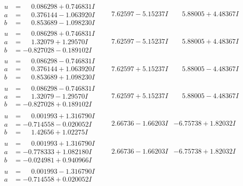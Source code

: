 \documentclass[1p]{elsarticle_modified}
\theoremstyle{definition}
\begin{document}
$$\begin{array}{c|c|c}
\begin{aligned}
u &= \phantom{-}0.086298 + 0.746831 I \\
a &= \phantom{-}0.376144 - 1.063920 I \\
b &= \phantom{-}0.853689 - 1.098230 I\end{aligned}
 & \phantom{-}7.62597 - 5.15237 I & \phantom{-}5.88005 + 4.48367 I \\ \hline\begin{aligned}
u &= \phantom{-}0.086298 + 0.746831 I \\
a &= \phantom{-}1.32079 + 1.29570 I \\
b &= -0.827028 - 0.189102 I\end{aligned}
 & \phantom{-}7.62597 - 5.15237 I & \phantom{-}5.88005 + 4.48367 I \\ \hline\begin{aligned}
u &= \phantom{-}0.086298 - 0.746831 I \\
a &= \phantom{-}0.376144 + 1.063920 I \\
b &= \phantom{-}0.853689 + 1.098230 I\end{aligned}
 & \phantom{-}7.62597 + 5.15237 I & \phantom{-}5.88005 - 4.48367 I \\ \hline\begin{aligned}
u &= \phantom{-}0.086298 - 0.746831 I \\
a &= \phantom{-}1.32079 - 1.29570 I \\
b &= -0.827028 + 0.189102 I\end{aligned}
 & \phantom{-}7.62597 + 5.15237 I & \phantom{-}5.88005 - 4.48367 I \\ \hline\begin{aligned}
u &= \phantom{-}0.001993 + 1.316790 I \\
a &= -0.714558 - 0.020052 I \\
b &= \phantom{-}1.42656 + 1.02275 I\end{aligned}
 & \phantom{-}2.66736 - 1.66203 I & -6.75738 + 1.82032 I \\ \hline\begin{aligned}
u &= \phantom{-}0.001993 + 1.316790 I \\
a &= -0.778333 + 1.082180 I \\
b &= -0.024981 + 0.940966 I\end{aligned}
 & \phantom{-}2.66736 - 1.66203 I & -6.75738 + 1.82032 I \\ \hline\begin{aligned}
u &= \phantom{-}0.001993 - 1.316790 I \\
a &= -0.714558 + 0.020052 I \\

\end{aligned}
\end{array}$$
\end{document}
